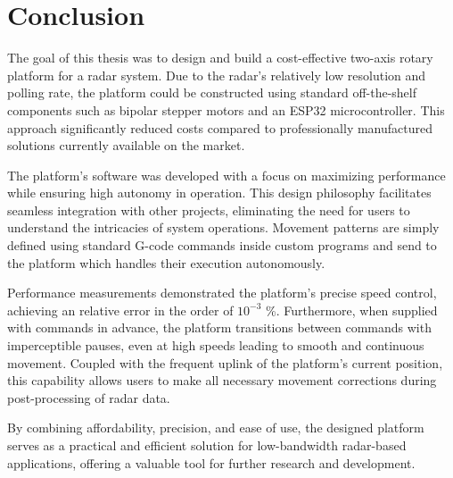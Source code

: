 \chapter*{Conclusion}

The goal of this thesis was to design and build a cost-effective two-axis rotary platform for a radar system.
Due to the radar's relatively low resolution and polling rate, the platform could be constructed using standard off-the-shelf components such as bipolar stepper motors and an ESP32 microcontroller.
This approach significantly reduced costs compared to professionally manufactured solutions currently available on the market.

The platform's software was developed with a focus on maximizing performance while ensuring high autonomy in operation.
This design philosophy facilitates seamless integration with other projects, eliminating the need for users to understand the intricacies of system operations.
Movement patterns are simply defined using standard G-code commands inside custom programs and send to the platform which handles their execution autonomously.

Performance measurements demonstrated the platform’s precise speed control, achieving an relative error in the order of $10^{-3}$ \%.
Furthermore, when supplied with commands in advance, the platform transitions between commands with imperceptible pauses, even at high speeds leading to smooth and continuous movement.
Coupled with the frequent uplink of the platform's current position, this capability allows users to make all necessary movement corrections during post-processing of radar data.

By combining affordability, precision, and ease of use, the designed platform serves as a practical and efficient solution for low-bandwidth radar-based applications, offering a valuable tool for further research and development.
